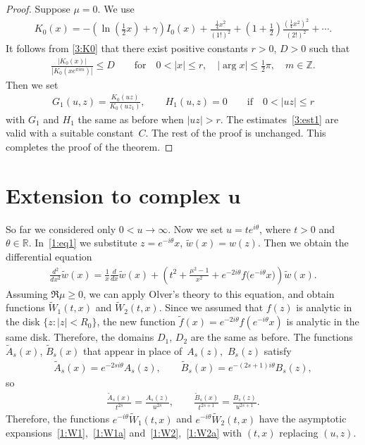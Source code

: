 \documentclass[pdftex]{sigma}
\newcommand{\R}{\mathbb{R}}
\numberwithin{equation}{section}
\begin{document}
\begin{proof}
Suppose $\mu=0$.
We use \cite[(10.31.2)]{NIST}
\begin{gather}\label{3:K0}
K_0(x)=-\left(\ln\left(\frac12x\right)+\gamma\right)I_0(x)+\frac{\frac14x^2}{(1!)^2}+\left(1+\frac12\right)
\frac{\left(\frac14x^2\right)^2}{\left(2!\right)^2}+\cdots.
\end{gather}
It follows from \eqref{3:K0} that there exist positive constants $r>0$, $D>0$ such that
\begin{gather*}%
\frac{|K_0(x)|}{|K_0(xe^{\pi i m})|}\le D \qquad\text{for} \quad 0<|x|\le r, \quad |\arg x|\le\frac12\pi, \quad m\in\mathbb{Z}.
\end{gather*}
Then we set
\begin{gather*}
G_1(u,z)=\frac{K_0(uz)}{K_0(uz_1)},\qquad H_1(u,z)=0\qquad\text{if} \quad 0<|uz|\le r
\end{gather*}
with $G_1$ and $H_1$ the same as before when $|uz|>r$. The estimates~\eqref{3:est1} are valid with a suitable constant~$C$.
The rest of the proof is unchanged.
This completes the proof of the theorem.
\end{proof}

\section[Extension to complex $u$]{Extension to complex $\boldsymbol{u}$}\label{extension}

So far we considered only $0<u\to\infty$. Now we set $u=te^{i\theta}$, where $t>0$ and $\theta\in\R$.
In~\eqref{1:eq1} we substitute $z=e^{-i\theta} x$, $\tilde w(x)=w(z)$.
Then we obtain the dif\/ferential equation
\begin{gather}\label{4:eq1}
\frac{d^2}{dx^2} \tilde w(x)=\frac{1}{x}\frac{d}{dx} \tilde w(x) +\left(t^2 +\frac{\mu^2-1}{x^2}+e^{-2i\theta}f\big(e^{-i\theta} x\big)\right)\tilde w(x) .
\end{gather}
Assuming $\Re\mu\ge0$, we can apply Olver's theory to this equation, and obtain functions $\tilde W_1(t,x)$ and $\tilde W_2(t,x)$.
Since we assumed that $f(z)$ is analytic in the disk $\{z\colon |z|<R_0\}$, the new function
$\tilde f(x)= e^{-2i\theta}f(e^{-i\theta} x)$ is analytic in the same disk. Therefore, the domains $D_1$, $D_2$ are the same as before.
The functions~$\tilde A_s(x)$, $\tilde B_s(x)$ that appear in place of~$A_s(z)$,~$B_s(z)$ satisfy
\begin{gather*}
\tilde A_s(x)=e^{-2si\theta} A_s(z),\qquad \tilde B_s(x)=e^{-(2s+1)i\theta} B_s(z) ,
\end{gather*}
so
\begin{gather*}
\frac{\tilde A_s(x)}{t^{2s}} =\frac{A_s(z)}{u^{2s}},\qquad \frac{\tilde B_s(x)}{t^{2s+1}} =\frac{B_s(z)}{u^{2s+1}}.
\end{gather*}
Therefore, the functions $e^{{-}i\theta} \tilde W_1(t{,}x)$ and $e^{{-}i\theta} \tilde W_2(t{,}x)$ have the asymptotic expan\-sions~\eqref{1:W1},~\eqref{1:W1a} and~\eqref{1:W2},~\eqref{1:W2a} with $(t,x)$ replacing $(u,z)$.
\end{document}
